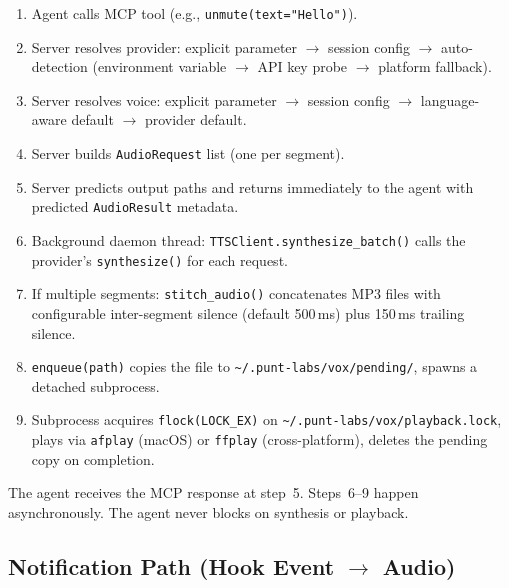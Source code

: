 \documentclass[a4paper,10pt]{article}
\newcommand{\tool}[1]{\texttt{#1}}
\begin{document}
\begin{enumerate}
  \item Agent calls MCP tool (e.g., \tool{unmute(text="Hello")}).
  \item Server resolves provider: explicit parameter $\to$ session
    config $\to$ auto-detection (environment variable $\to$ API key
    probe $\to$ platform fallback).
  \item Server resolves voice: explicit parameter $\to$ session config
    $\to$ language-aware default $\to$ provider default.
  \item Server builds \texttt{AudioRequest} list (one per segment).
  \item Server predicts output paths and returns immediately to the
    agent with predicted \texttt{AudioResult} metadata.
  \item Background daemon thread: \texttt{TTSClient.synthesize\_batch()}
    calls the provider's \texttt{synthesize()} for each request.
  \item If multiple segments: \texttt{stitch\_audio()} concatenates
    MP3 files with configurable inter-segment silence (default
    500\,ms) plus 150\,ms trailing silence.
  \item \texttt{enqueue(path)} copies the file to
    \texttt{\~{}/.punt-labs/vox/pending/}, spawns a detached subprocess.
  \item Subprocess acquires \texttt{flock(LOCK\_EX)} on
    \texttt{\~{}/.punt-labs/vox/playback.lock}, plays via
    \texttt{afplay} (macOS) or \texttt{ffplay} (cross-platform),
    deletes the pending copy on completion.
\end{enumerate}

The agent receives the MCP response at step~5.  Steps~6--9 happen
asynchronously.  The agent never blocks on synthesis or playback.

\subsection{Notification Path (Hook Event $\to$ Audio)}
\end{document}
